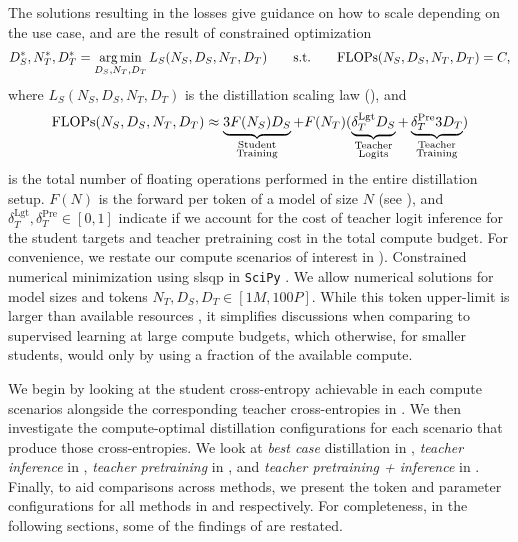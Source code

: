 The solutions resulting in the losses give guidance on how to scale depending on the use case,
and are the result of constrained optimization
\begin{align}
    D_S^*,N_T^*,D_T^*=\operatorname*{arg\,min}_{D_S,N_T,D_T}L_S(N_S,D_S,N_T,D_T)
    \qquad
    \mathrm{s.t.} \qquad \mathrm{FLOPs}(N_S,D_S,N_T,D_T)=C,
    \label{eq:distillation-optimal-appl}
\end{align}
where $L_S(N_S,D_S,N_T,D_T)$ is the distillation scaling law (),
and
\begin{equation}
    \mathrm{FLOPs}(N_S,D_S,N_T,D_T)\approx
    \underbrace{3F(N_S)D_S}_{\substack{\mathrm{Student}\\\mathrm{Training}}}
    +F(N_T)(
    \underbrace{\delta_T^{\mathrm{Lgt}}D_S}_{\substack{\mathrm{Teacher}\\\mathrm{Logits}}} + \underbrace{\delta_T^{\mathrm{Pre}}3D_T}_{\substack{\mathrm{Teacher}\\\mathrm{Training}}})
    \label{eq:distillation-compute-app}
    \vspace{-0.2cm}
\end{equation}
is the total number of floating operations performed in the entire distillation setup.
$F(N)$ is the forward \flops per token of a model of size $N$ (see ),
and $\delta_T^{\mathrm{Lgt}},\delta_T^{\mathrm{Pre}}\in[0,1]$ 
indicate if we account for the cost of teacher logit inference for the student targets and teacher pretraining cost in the total compute budget.
For convenience, we restate our compute scenarios of interest in ).
Constrained numerical minimization using \gls{slsqp} \citep{kraft1988software} in \texttt{SciPy} \citep{DBLP:journals/corr/abs-1907-10121}.
We allow numerical solutions for model sizes and tokens $N_T,D_S,D_T\in[1M,100P]$.
While this token upper-limit is larger than available resources \citep{epoch2023aitrends},
it simplifies discussions when comparing to supervised learning at large compute budgets, which otherwise, for smaller students, would only by using a fraction of the available compute.

We begin by looking at the student cross-entropy achievable in each compute scenarios alongside the corresponding teacher cross-entropies in .
We then investigate the compute-optimal distillation configurations for each scenario that produce those cross-entropies.
We look at \emph{best case} distillation in 
,
\emph{teacher inference} in
,
\emph{teacher pretraining} in
,
and 
\emph{teacher pretraining + inference}
in
.
Finally, to aid comparisons across methods,
we present the token and parameter configurations for all methods in
 and  respectively.
For completeness, in the following sections, some of the findings of  are restated.



